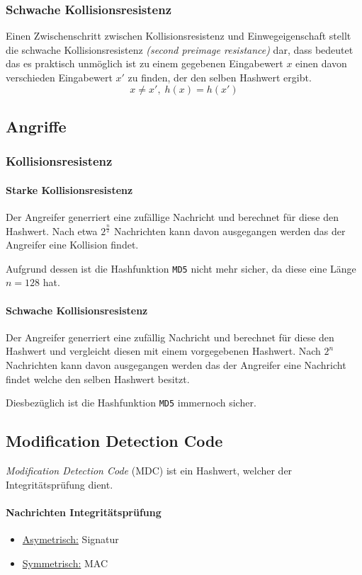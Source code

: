 \documentclass[a4paper,landscape]{article}
\begin{document}
\begin{multicols*}{4}
	\subsubsection{Schwache Kollisionsresistenz}
	Einen Zwischenschritt zwischen Kollisionsresistenz und Einwegeigenschaft
	stellt die schwache Kollisionsresistenz \emph{(second preimage resistance)}
	dar, dass bedeutet das es praktisch unmöglich ist zu einem gegebenen
	Eingabewert \(x\) einen davon verschieden Eingabewert \(x'\) zu finden, der
	den selben Hashwert ergibt. \[x \neq x',\; h(x) = h(x')\]

	\subsection{Angriffe}
	\subsubsection*{Kollisionsresistenz}
	\paragraph{Starke Kollisionsresistenz}
	Der Angreifer generriert eine zufällige Nachricht und berechnet für diese
	den Hashwert. Nach etwa \(2^{\frac{n}{2}}\) Nachrichten kann davon
	ausgegangen werden das der Angreifer eine Kollision findet. \par
	Aufgrund dessen ist die Hashfunktion \texttt{MD5} nicht mehr sicher, da
	diese eine Länge \(n = 128\) hat.
	\paragraph{Schwache Kollisionsresistenz}
	Der Angreifer generriert eine zufällig Nachricht und berechnet für diese
	den Hashwert und vergleicht diesen mit einem vorgegebenen Hashwert. Nach
	\(2^{n}\) Nachrichten kann davon ausgegangen werden das der Angreifer eine
	Nachricht findet welche den selben Hashwert besitzt. \par
	Diesbezüglich ist die Hashfunktion \texttt{MD5} immernoch sicher.

	\subsection{Modification Detection Code}
	\emph{Modification Detection Code} (MDC) ist ein Hashwert, welcher der
	Integritätsprüfung dient.
	\paragraph{Nachrichten Integritätsprüfung}
	\begin{itemize}[nolistsep]
		\item \underline{Asymetrisch:} Signatur
		\item \underline{Symmetrisch:} MAC
	\end{itemize}


\end{multicols*}
\end{document}
